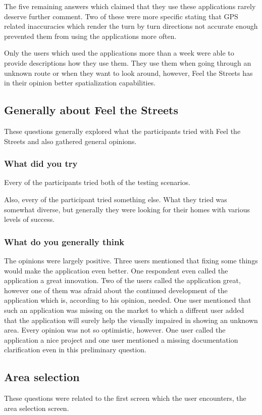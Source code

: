 \documentclass[nolof,digital]{fithesis3}
\begin{document}
The five remaining answers which claimed that they use these applications rarely deserve further comment. Two of these were more specific stating that GPS related inaccuracies which render the turn by turn directions not accurate enough prevented them from using the applications more often.

Only the users which used the applications more than a week were able to provide descriptions how they use them. They use them when going through an unknown route or when they want to look around, however, Feel the Streets has in their opinion better spatialization capabilities.
\subsection{Generally about Feel the Streets}
These questions generally explored what the participants tried with Feel the Streets and also gathered general opinions.
\subsubsection{What did you try}
Every of the participants tried both of the testing scenarios.

Also, every of the participant tried something else. What they tried was somewhat diverse, but generally they were looking for their homes with various levels of success.
\subsubsection{What do you generally think}
The opinions were largely positive. Three users mentioned that fixing some things would make the application even better. One respondent even called the application a great innovation. Two of the users called the application great, however one of them was afraid about the continued development of the application which is, according to his opinion, needed. One user mentioned that such an application was missing on the market to which a diffrent user added that the application will surely help the visually impaired in showing an unknown area. Every opinion was not so optimistic, however. One user called the application a nice project and one user mentioned a missing documentation clarification even in this preliminary question.
\subsection{Area selection}
These questions were related to the first screen which the user encounters, the area selection screen.
\end{document}
